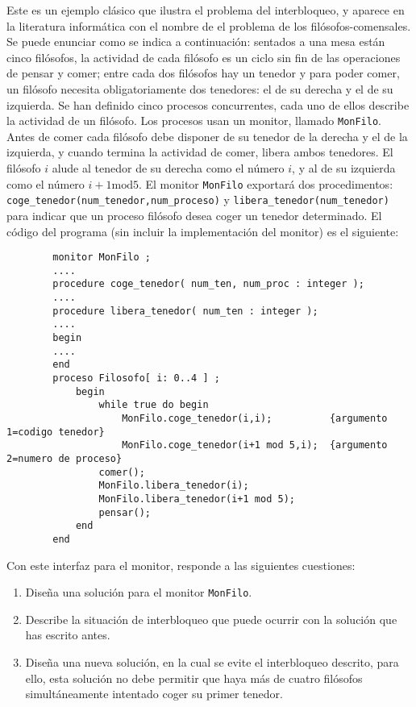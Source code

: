 \begin{ejercicio}
    Este es un ejemplo clásico que ilustra el problema del interbloqueo, y aparece en la literatura informática con el nombre de el problema de los filósofos-comensales. Se puede enunciar como se indica a continuación: sentados a una mesa están cinco filósofos, la actividad de cada filósofo es un ciclo sin fin de las operaciones de pensar y comer; entre cada dos filósofos hay un tenedor y para poder comer, un filósofo necesita obligatoriamente dos tenedores: el de su derecha y el de su izquierda. Se han definido cinco procesos concurrentes, cada uno de ellos describe la actividad de un filósofo. Los procesos usan un monitor, llamado \verb|MonFilo|. Antes de comer cada filósofo debe disponer de su tenedor de la derecha y el de la izquierda, y cuando termina la actividad de comer, libera ambos tenedores. El filósofo $i$ alude al tenedor de su derecha como el número $i$, y al de su izquierda como el número $i + 1 \text{mod} 5$. El monitor \verb|MonFilo| exportará dos procedimentos: \verb|coge_tenedor(num_tenedor,num_proceso)| y \verb|libera_tenedor(num_tenedor)| para indicar que un proceso filósofo desea coger un tenedor determinado. El código del programa (sin incluir la implementación del monitor) es el siguiente:
    \begin{verbatim}
        monitor MonFilo ;
        ....
        procedure coge_tenedor( num_ten, num_proc : integer );
        ....
        procedure libera_tenedor( num_ten : integer );
        ....
        begin
        ....
        end
        proceso Filosofo[ i: 0..4 ] ;
            begin
                while true do begin
                    MonFilo.coge_tenedor(i,i);          {argumento 1=codigo tenedor}
                    MonFilo.coge_tenedor(i+1 mod 5,i);  {argumento 2=numero de proceso}
                comer();
                MonFilo.libera_tenedor(i);
                MonFilo.libera_tenedor(i+1 mod 5);
                pensar();
            end
        end
    \end{verbatim}

    Con este interfaz para el monitor, responde a las siguientes cuestiones:
    \begin{enumerate}
        \item Diseña una solución para el monitor \verb|MonFilo|.
        \item Describe la situación de interbloqueo que puede ocurrir con la solución que has escrito antes.
        \item Diseña una nueva solución, en la cual se evite el interbloqueo descrito, para ello, esta solución no debe permitir que haya más de cuatro filósofos simultáneamente intentado coger su primer tenedor.
    \end{enumerate}

\end{ejercicio}







